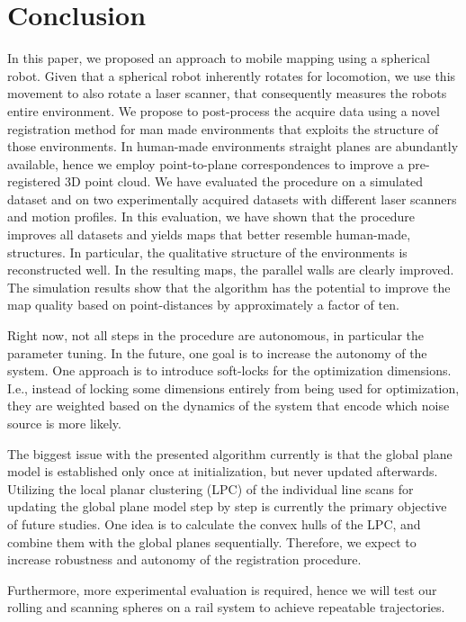 \section{Conclusion}

In this paper, we proposed an approach to mobile mapping using a spherical robot. 
Given that a spherical robot inherently rotates for locomotion, we use this movement to also rotate a laser scanner, that consequently measures the robots entire environment.
We propose to post-process the acquire data using a novel registration method for man made environments that exploits the structure of those environments. 
In human-made environments straight planes are abundantly available, hence we employ point-to-plane correspondences to improve a pre-registered 3D point cloud. 
We have evaluated the procedure on a simulated dataset and on two experimentally acquired datasets with different laser scanners and motion profiles. 
In this evaluation, we have shown that the procedure improves all datasets and yields maps that better resemble human-made, structures. 
In particular, the qualitative structure of the environments is reconstructed well. 
In the resulting maps, the parallel walls are clearly improved.
The simulation results show that the algorithm has the potential to improve the map quality based on point-distances by approximately a factor of ten.

%
Right now, not all steps in the procedure are autonomous, in particular the parameter tuning. 
In the future, one goal is to increase the autonomy of the system.
One approach is to introduce soft-locks for the optimization dimensions.
I.e., instead of locking some dimensions entirely from being used for optimization, they are weighted based on the dynamics of the system that encode which noise source is more likely.  

%
The biggest issue with the presented algorithm currently is that the global plane model is established only once at initialization, but never updated afterwards.
Utilizing the local planar clustering (LPC) of the individual line scans for updating the global plane model step by step is currently the primary objective of future studies.
One idea is to calculate the convex hulls of the LPC, and combine them with the global planes sequentially.
Therefore, we expect to increase robustness and autonomy of the registration procedure.

%
Furthermore, more experimental evaluation is required, hence we will test our rolling and scanning spheres on a rail system to achieve repeatable trajectories. 

